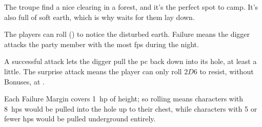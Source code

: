 

The troupe find a nice clearing in a forest, and it's the perfect spot to camp.
It's also full of soft earth, which is why  waits for them lay down.

The players can roll  (\tn[10]) to notice the disturbed earth.
Failure means the \gls{digger} attacks the party member with the most \glspl{fp} during the night.

\mouthdigger

\addtocounter{tn}{\value{Brawl}}
\addtocounter{tn}{2}

A successful attack lets the \gls{digger} pull the \gls{pc} back down into its hole, at least a little.
The surprise attack means the player can only roll $2D6$ to resist, without Bonuses, at \tn.
\addtocounter{tn}{-5}
Each Failure Margin covers 1~\gls{hp} of height; so rolling  means characters with 8~\glspl{hp} would be pulled into the hole up to their chest, while characters with 5 or fewer \glspl{hp} would be pulled underground entirely.


